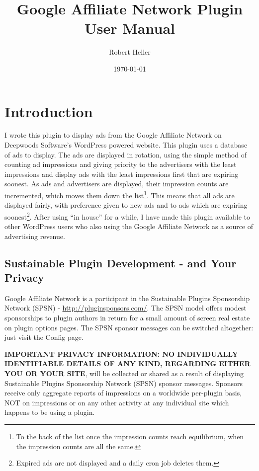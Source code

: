 \documentclass[letterpaper]{article}
\title{Google Affiliate Network Plugin User Manual}
\author{Robert Heller}
\date{\today}
\begin{document}
\maketitle

\tableofcontents

\section{Introduction}

I wrote this plugin to display ads from the Google Affiliate Network on
Deepwoods Software's WordPress powered website. This plugin uses a
database of ads to display.  The ads are displayed in rotation, using
the simple method of counting ad impressions and giving priority to the
advertisers with the least impressions and display ads with the least
impressions first that are expiring soonest.  As ads and advertisers
are displayed, their impression counts are incremented, which moves
them down the list\footnote{To the back of the list once the impression
counts reach equilibrium, when the impression counts are all the
same.}.  This means that all ads are displayed fairly, with preference
given to new ads and to ads which are expiring soonest\footnote{Expired
ads are not displayed and a daily cron job deletes them.}. After using
``in house'' for a while, I have made this plugin available to other
WordPress users who also using the Google Affiliate Network as a source
of advertising revenue.

\subsection{Sustainable Plugin Development - and Your Privacy}

Google Affiliate Network is a participant in the Sustainable Plugins
Sponsorship Network (SPSN) - \url{http://pluginsponsors.com/}. The SPSN
model offers modest sponsorships to plugin authors in return for a
small amount of screen real estate on plugin options pages. The SPSN
sponsor messages can be switched altogether: just visit the Config
page.

\textbf{IMPORTANT PRIVACY INFORMATION: NO INDIVIDUALLY IDENTIFIABLE
DETAILS OF ANY KIND, REGARDING EITHER YOU OR YOUR SITE}, will be
collected or shared as a result of displaying Sustainable Plugins
Sponsorship Network (SPSN) sponsor messages. Sponsors receive only
aggregate reports of impressions on a worldwide per-plugin basis, NOT
on impressions or on any other activity at any individual site which
happens to be using a plugin.
\end{document}
